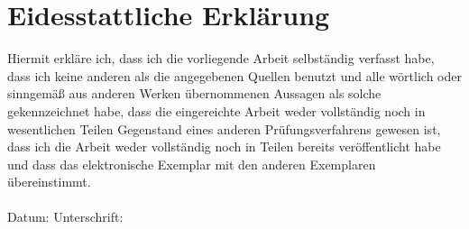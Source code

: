 \chapter*{Eidesstattliche Erklärung}
\label{erklaerung}
Hiermit erkläre ich, dass ich die vorliegende Arbeit selbständig verfasst habe, dass ich keine anderen als die angegebenen Quellen benutzt und alle wörtlich oder sinngemäß aus anderen Werken übernommenen Aussagen als solche gekennzeichnet habe, dass die eingereichte Arbeit weder vollständig noch in wesentlichen Teilen Gegenstand eines anderen Prüfungsverfahrens gewesen ist, dass ich die Arbeit weder vollständig noch in Teilen bereits veröffentlicht habe und dass das elektronische Exemplar mit den anderen Exemplaren übereinstimmt. \\
\\[1.5cm]
Datum:	\hrulefill\enspace Unterschrift: \hrulefill
\\[3.5cm]